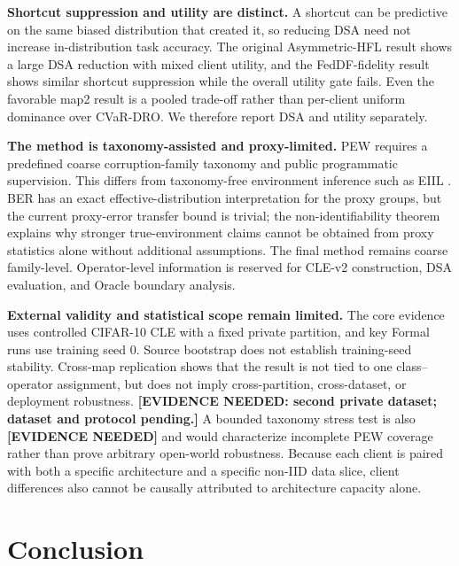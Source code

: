 \documentclass[10pt,twocolumn]{article}
\begin{document}
\textbf{Shortcut suppression and utility are distinct.} A shortcut can be predictive on the same biased distribution that created it, so reducing DSA need not increase in-distribution task accuracy. The original Asymmetric-HFL result shows a large DSA reduction with mixed client utility, and the FedDF-fidelity result shows similar shortcut suppression while the overall utility gate fails. Even the favorable map2 result is a pooled trade-off rather than per-client uniform dominance over CVaR-DRO. We therefore report DSA and utility separately.

\textbf{The method is taxonomy-assisted and proxy-limited.} PEW requires a predefined coarse corruption-family taxonomy and public programmatic supervision. This differs from taxonomy-free environment inference such as EIIL \citep{creager2021eiil}. BER has an exact effective-distribution interpretation for the proxy groups, but the current proxy-error transfer bound is trivial; the non-identifiability theorem explains why stronger true-environment claims cannot be obtained from proxy statistics alone without additional assumptions. The final method remains coarse family-level. Operator-level information is reserved for CLE-v2 construction, DSA evaluation, and Oracle boundary analysis.

\textbf{External validity and statistical scope remain limited.} The core evidence uses controlled CIFAR-10 CLE with a fixed private partition, and key Formal runs use training seed 0. Source bootstrap does not establish training-seed stability. Cross-map replication shows that the result is not tied to one class--operator assignment, but does not imply cross-partition, cross-dataset, or deployment robustness. \textbf{[EVIDENCE NEEDED: second private dataset; dataset and protocol pending.]} A bounded taxonomy stress test is also \textbf{[EVIDENCE NEEDED]} and would characterize incomplete PEW coverage rather than prove arbitrary open-world robustness. Because each client is paired with both a specific architecture and a specific non-IID data slice, client differences also cannot be causally attributed to architecture capacity alone.

\section{Conclusion}
\end{document}
